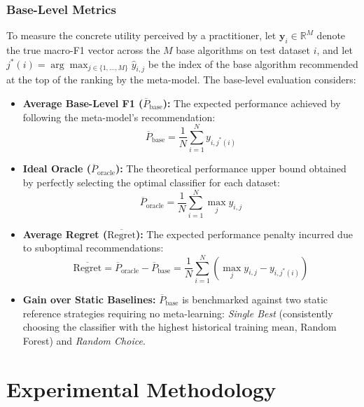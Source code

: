 \documentclass[12pt]{article}
\begin{document}
\subsubsection{Base-Level Metrics}
To measure the concrete utility perceived by a practitioner, let $\mathbf{y}_i \in \mathbb{R}^M$ denote the true macro-F1 vector across the $M$ base algorithms on test dataset $i$, and let $j^*(i) = \arg\max_{j \in \{1, \dots, M\}} \hat{y}_{i, j}$ be the index of the base algorithm recommended at the top of the ranking by the meta-model. The base-level evaluation considers:
\begin{itemize}
  \item \textbf{Average Base-Level F1 ($\overline{P}_{\text{base}}$):} The expected performance achieved by following the meta-model's recommendation:
  \begin{equation}
    \overline{P}_{\text{base}} = \frac{1}{N} \sum_{i=1}^N y_{i, j^*(i)}
  \end{equation}
  \item \textbf{Ideal Oracle ($\overline{P}_{\text{oracle}}$):} The theoretical performance upper bound obtained by perfectly selecting the optimal classifier for each dataset:
  \begin{equation}
    \overline{P}_{\text{oracle}} = \frac{1}{N} \sum_{i=1}^N \max_{j} y_{i, j}
  \end{equation}
  \item \textbf{Average Regret ($\overline{\text{Regret}}$):} The expected performance penalty incurred due to suboptimal recommendations:
  \begin{equation}
    \overline{\text{Regret}} = \overline{P}_{\text{oracle}} - \overline{P}_{\text{base}} = \frac{1}{N} \sum_{i=1}^N \left( \max_{j} y_{i, j} - y_{i, j^*(i)} \right)
  \end{equation}
  \item \textbf{Gain over Static Baselines:} $\overline{P}_{\text{base}}$ is benchmarked against two static reference strategies requiring no meta-learning: \textit{Single Best} (consistently choosing the classifier with the highest historical training mean, Random Forest) and \textit{Random Choice}.
\end{itemize}

\section{Experimental Methodology}
\end{document}
